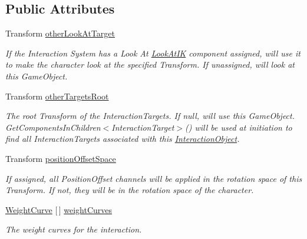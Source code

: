\subsection*{Public Attributes}
\begin{DoxyCompactItemize}
\item 
Transform \mbox{\hyperlink{class_root_motion_1_1_final_i_k_1_1_interaction_object_a75b123a9c0b837079def9544569923b4}{other\+Look\+At\+Target}}
\begin{DoxyCompactList}\small\item\em If the Interaction System has a \textquotesingle{}Look At\textquotesingle{} \mbox{\hyperlink{class_root_motion_1_1_final_i_k_1_1_look_at_i_k}{Look\+At\+IK}} component assigned, will use it to make the character look at the specified Transform. If unassigned, will look at this Game\+Object. \end{DoxyCompactList}\item 
Transform \mbox{\hyperlink{class_root_motion_1_1_final_i_k_1_1_interaction_object_a6f08d5b22b8286aad0168efdf1340353}{other\+Targets\+Root}}
\begin{DoxyCompactList}\small\item\em The root Transform of the Interaction\+Targets. If null, will use this Game\+Object. Get\+Components\+In\+Children$<$\+Interaction\+Target$>$() will be used at initiation to find all Interaction\+Targets associated with this \mbox{\hyperlink{class_root_motion_1_1_final_i_k_1_1_interaction_object}{Interaction\+Object}}. \end{DoxyCompactList}\item 
Transform \mbox{\hyperlink{class_root_motion_1_1_final_i_k_1_1_interaction_object_a48b9b33f43b92c3f6fb5d5a8108c1dfb}{position\+Offset\+Space}}
\begin{DoxyCompactList}\small\item\em If assigned, all Position\+Offset channels will be applied in the rotation space of this Transform. If not, they will be in the rotation space of the character. \end{DoxyCompactList}\item 
\mbox{\hyperlink{class_root_motion_1_1_final_i_k_1_1_interaction_object_1_1_weight_curve}{Weight\+Curve}} \mbox{[}$\,$\mbox{]} \mbox{\hyperlink{class_root_motion_1_1_final_i_k_1_1_interaction_object_a3ae0829b89959bc751999003d7e3fd95}{weight\+Curves}}
\begin{DoxyCompactList}\small\item\em The weight curves for the interaction. \end{DoxyCompactList}\item 

\end{DoxyCompactItemize}
